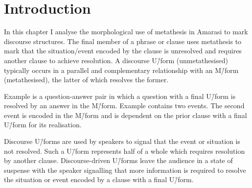 \section{Introduction}
In this chapter I analyse the morphological use of metathesis
in Amarasi to mark discourse structures.
The final member of a phrase or clause uses
metathesis to mark that the situation/event encoded
by the clause is unresolved and requires another clause to achieve resolution.
A discourse U\=/form (unmetathesised) typically
occurs in a parallel and complementary relationship
with an M\=/form (metathesised), the latter of which resolves the former.

Example  is a question-answer
pair in which a question with a final U\=/form
is resolved by an answer in the M\=/form.
Example  contains two events.
The second event is encoded in the M\=/form and is dependent
on the prior clause with a final U\=/form for its realisation.

\begin{exe}
	\vspace{4pt}\label{ex:02/08/13, p.20 -2} 
	\label{ex:130909-6, 0.39 -2}
\end{exe}

Discourse U\=/forms are used by speakers to signal that
the event or situation is not resolved.
Such a U\=/form represents half of a whole
which requires resolution by another clause.
Discourse-driven U\=/forms leave the audience in a state of  suspense
with the speaker signalling that more information
is required to resolve the situation or event
encoded by a clause with a final U\=/form.

